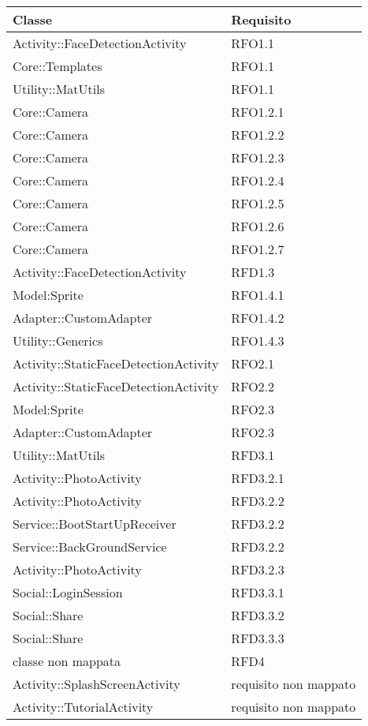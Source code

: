 \begin{center}
    \begin{longtable}{| p{6cm} | p{2cm} |}
    \hline
    Classe & Requisito \\ \hline
     Activity::FaceDetectionActivity & RFO1.1  \\ \hline
     Core::Templates & RFO1.1 \\ \hline
     Utility::MatUtils & RFO1.1 \\ \hline
     Core::Camera & RFO1.2.1 \\ \hline
     Core::Camera & RFO1.2.2\\ \hline
     Core::Camera & RFO1.2.3  \\ \hline
     Core::Camera & RFO1.2.4 \\ \hline
     Core::Camera & RFO1.2.5\\ \hline
     Core::Camera & RFO1.2.6\\ \hline
     Core::Camera & RFO1.2.7 \\ \hline
     Activity::FaceDetectionActivity & RFD1.3 \\ \hline    
	 Model:Sprite & RFO1.4.1 \\ \hline
     Adapter::CustomAdapter & RFO1.4.2  \\ \hline
     Utility::Generics & RFO1.4.3 \\ \hline
     Activity::StaticFaceDetectionActivity & RFO2.1 \\ \hline
     Activity::StaticFaceDetectionActivity & RFO2.2\\ \hline
	 Model:Sprite & RFO2.3 \\ \hline
     Adapter::CustomAdapter & RFO2.3  \\ \hline
     Utility::MatUtils & RFD3.1 \\ \hline
     Activity::PhotoActivity & RFD3.2.1   \\ \hline
     Activity::PhotoActivity & RFD3.2.2  \\ \hline
     Service::BootStartUpReceiver & RFD3.2.2 \\ \hline
     Service::BackGroundService  & RFD3.2.2 \\ \hline
     Activity::PhotoActivity & RFD3.2.3 \\ \hline    
     Social::LoginSession & RFD3.3.1 \\ \hline
     Social::Share & RFD3.3.2 \\ \hline
     Social::Share & RFD3.3.3\\ \hline
     classe non mappata & RFD4  \\ \hline
     Activity::SplashScreenActivity & requisito non mappato  \\ \hline
     Activity::TutorialActivity & requisito non mappato  \\ \hline
    \end{longtable}
\end{center}

